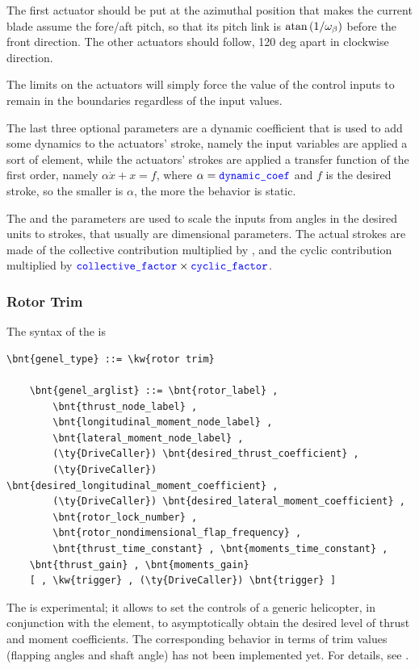 The first actuator should be put at the azimuthal position 
that makes the current blade assume the fore/aft pitch,
so that its pitch link is $\mathrm{atan}\left( 1/\omega_{\beta} \right)$
before the front direction.
The other actuators should follow, 120 deg apart in clockwise direction.

The limits on the actuators will simply force the value of the control
inputs to remain in the boundaries regardless of the input values.

The last three optional parameters are a dynamic coefficient that is used to
add some dynamics to the actuators' stroke, namely the input variables are
applied a sort of   element, while the
actuators' strokes are applied a transfer function of the first order, namely
$ \alpha\dot{x}+x=f $, where $ \alpha=\textcolor{blue}{\texttt{dynamic\_coef}} $ and $ f $ is
the desired stroke, so the smaller is $ \alpha $, the more the behavior is
static.

The  and the  parameters are
used to scale the inputs from angles in the desired units to strokes, that
usually are dimensional parameters. The actual strokes are made of the
collective contribution multiplied by , and the
cyclic contribution multiplied by
$\textcolor{blue}{\texttt{collective\_factor}} \times \textcolor{blue}{\texttt{cyclic\_factor}}$.

\subsubsection{Rotor Trim}
\label{sec:EL:GENEL:ROTOR-TRIM}
The syntax of the  is
\begin{Verbatim}[commandchars=\\\{\}]
    \bnt{genel_type} ::= \kw{rotor trim}

    \bnt{genel_arglist} ::= \bnt{rotor_label} ,
        \bnt{thrust_node_label} ,
        \bnt{longitudinal_moment_node_label} ,
        \bnt{lateral_moment_node_label} ,
        (\ty{DriveCaller}) \bnt{desired_thrust_coefficient} ,
        (\ty{DriveCaller}) \bnt{desired_longitudinal_moment_coefficient} ,
        (\ty{DriveCaller}) \bnt{desired_lateral_moment_coefficient} ,
        \bnt{rotor_lock_number} ,
        \bnt{rotor_nondimensional_flap_frequency} ,
        \bnt{thrust_time_constant} , \bnt{moments_time_constant} ,
	\bnt{thrust_gain} , \bnt{moments_gain}
	[ , \kw{trigger} , (\ty{DriveCaller}) \bnt{trigger} ]
\end{Verbatim}
The  is experimental; it allows to set the controls 
of a generic helicopter, in conjunction with the 
element, to asymptotically obtain the desired level of thrust and
moment coefficients.
The corresponding behavior in terms of trim values (flapping angles
and shaft angle) has not been implemented yet.
For details, see \cite{PETERS-TRIM90}.







